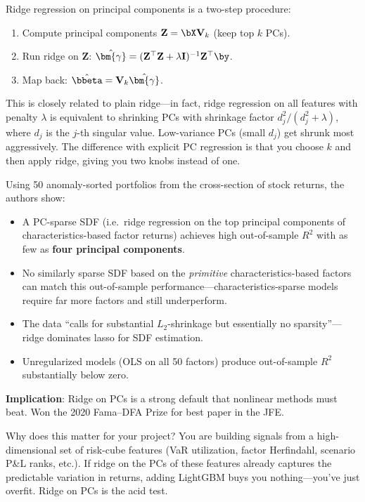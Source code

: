 Ridge regression on principal components is a two-step procedure:
\begin{enumerate}[nosep]
  \item Compute principal components $\mathbf{Z} = \bX \mathbf{V}_k$ (keep top $k$ PCs).
  \item Run ridge on $\mathbf{Z}$: $\hat{\bm{\gamma}} = (\mathbf{Z}^\top\mathbf{Z} + \lambda \mathbf{I})^{-1}\mathbf{Z}^\top\by$.
  \item Map back: $\hat{\bbeta} = \mathbf{V}_k \hat{\bm{\gamma}}$.
\end{enumerate}

This is closely related to plain ridge---in fact, ridge regression on all features with penalty $\lambda$ is equivalent to shrinking PCs with shrinkage factor $d_j^2 / (d_j^2 + \lambda)$, where $d_j$ is the $j$-th singular value.
Low-variance PCs (small $d_j$) get shrunk most aggressively.
The difference with explicit PC regression is that you choose $k$ and then apply ridge, giving you two knobs instead of one.

\begin{keyresult}
Using 50 anomaly-sorted portfolios from the cross-section of stock returns, the authors show:
\begin{itemize}[nosep]
  \item A PC-sparse SDF (i.e.\ ridge regression on the top principal components of characteristics-based factor returns) achieves high out-of-sample $R^2$ with as few as \textbf{four principal components}.
  \item No similarly sparse SDF based on the \emph{primitive} characteristics-based factors can match this out-of-sample performance---characteristics-sparse models require far more factors and still underperform.
  \item The data ``calls for substantial $L_2$-shrinkage but essentially no sparsity''---ridge dominates lasso for SDF estimation.
  \item Unregularized models (OLS on all 50 factors) produce out-of-sample $R^2$ substantially below zero.
\end{itemize}
\textbf{Implication}: Ridge on PCs is a strong default that nonlinear methods must beat. Won the 2020 Fama--DFA Prize for best paper in the JFE.
\end{keyresult}

Why does this matter for your project? You are building signals from a high-dimensional set of risk-cube features (VaR utilization, factor Herfindahl, scenario P\&L ranks, etc.). If ridge on the PCs of these features already captures the predictable variation in returns, adding LightGBM buys you nothing---you've just overfit. Ridge on PCs is the acid test.

